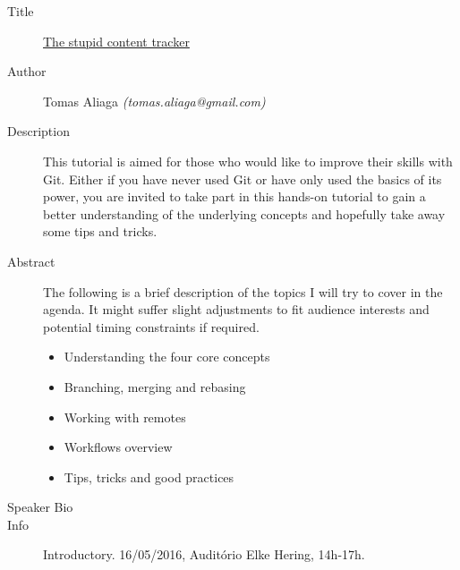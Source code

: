 \begin{description}
   \item[Title] \underline{The stupid content tracker}
   \item[Author] Tomas Aliaga \emph{(tomas.aliaga@gmail.com)}
   \item[Description] This tutorial is aimed for those who would like to improve their skills with Git. Either if you have never used Git or have only used the basics of its power, you are invited to take part in this hands-on tutorial to gain a better understanding of the underlying concepts and hopefully take away some tips and tricks. 
   \item[Abstract] The following is a brief description of the topics I will try to cover in the agenda. It might suffer slight adjustments to fit audience interests and potential timing constraints if required.
   \begin{itemize}
      \item Understanding the four core concepts
      \item Branching, merging and rebasing
      \item Working with remotes
      \item Workflows overview
      \item Tips, tricks and good practices
   \end{itemize}
    \item[Speaker Bio] 
    \item[Info] Introductory. 16/05/2016, Auditório Elke Hering, 14h-17h.
\end{description} 
